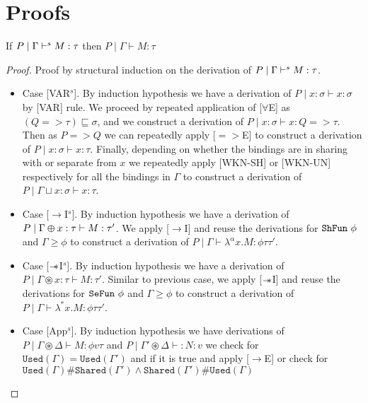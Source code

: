 \chapter{Proofs}
\begin{theorem}\label{thm:soundness-syntax-directed}
   If $P \mid \Gamma \vdash^s M:\tau$ then $P \mid \Gamma \vdash M:\tau$
\end{theorem}
\begin{proof}\label{prf:soundness-syntax-directed}
  Proof by structural induction on the derivation of $P \mid \Gamma \vdash^s M:\tau$.

  \begin{itemize}
  \item{Case [VAR$^s$].}
    By induction hypothesis we have a derivation of $P \mid x:\sigma \vdash x:\sigma$ by [VAR] rule.
    We proceed by repeated application of [$\forall$E] as $(Q => \tau) \sqsubseteq \sigma$, and
    we construct a derivation of $P \mid x:\sigma \vdash x: Q => \tau$. Then as $P => Q$ we can
    repeatedly apply [$=>$E] to construct a derivation of $P \mid x:\sigma \vdash x:\tau$.
    Finally, depending on whether the bindings are in sharing with or separate from
    $x$ we repeatedly apply [WKN-SH] or [WKN-UN] respectively for all the bindings in $\Gamma$ to construct
    a derivation of $P \mid \Gamma \sqcup x:\sigma \vdash x:\tau$.
  \item{Case [$\rightarrow$I$^s$].}
    By induction hypothesis we have a derivation of $P \mid \Gamma \varoplus x:\tau \vdash M:\tau'$.
    We apply [$\rightarrow$I] and reuse the derivations for $\texttt{ShFun}\ \phi$ and $\Gamma \geq \phi$  to
    construct a derivation of $P \mid \Gamma \vdash \lambda^{\alpha}x. M: \phi \tau \tau'$.
  \item{Case [$\mathrel{-\mkern-6mu*}$I$^s$].}
    By induction hypothesis we have a derivation of $P \mid \Gamma \circledast x:\tau \vdash M:\tau'$.
    Similar to previous case, we apply [$\mathrel{-\mkern-6mu*}$I] and reuse the derivations for $\texttt{SeFun}\ \phi$ and $\Gamma \geq \phi$  to
    construct a derivation of $P \mid \Gamma \vdash \lambda^{*}x. M: \phi \tau \tau'$.
  \item{Case [App$^s$].}
    By induction hypothesis we have derivations of $P \mid \Gamma \circledast \Delta \vdash M: \phi v \tau$ and
    $P \mid \Gamma' \circledast \Delta \vdash: N:v$ we check for $\texttt{Used}(\Gamma) = \texttt{Used}(\Gamma')$ and if it is true
    and apply [$\rightarrow$E] or check for $\texttt{Used}(\Gamma)\#\texttt{Shared}(\Gamma') \wedge \texttt{Shared}(\Gamma')\#\texttt{Used}(\Gamma)$

\end{itemize}
\end{proof}
